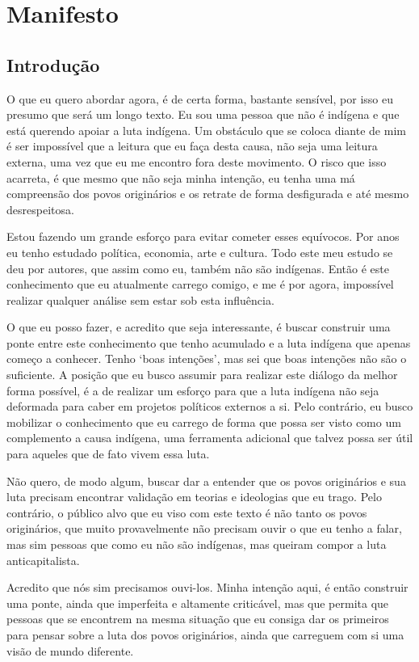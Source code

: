 \section{Manifesto}
\subsection{Introdução}

O que eu quero abordar agora, é de certa forma, bastante sensível, por isso eu presumo que será um longo texto. Eu sou uma pessoa que não é indígena e que está querendo apoiar a luta indígena. Um obstáculo que se coloca diante de mim é ser impossível que a leitura que eu faça desta causa, não seja uma leitura externa, uma vez que eu me encontro fora deste movimento. O risco que isso acarreta, é que mesmo que não seja minha intenção, eu tenha uma má compreensão dos povos originários e os retrate de forma desfigurada e até mesmo desrespeitosa.

Estou fazendo um grande esforço para evitar cometer esses equívocos. Por anos eu tenho estudado política, economia, arte e cultura. Todo este meu estudo se deu por autores, que assim como eu, também não são indígenas. Então é este conhecimento que eu atualmente carrego comigo, e me é por agora, impossível realizar qualquer análise sem estar sob esta influência.

O que eu posso fazer, e acredito que seja interessante, é buscar construir uma ponte entre este conhecimento que tenho acumulado e a luta indígena que apenas começo a conhecer. Tenho ‘boas intenções’, mas sei que boas intenções não são o suficiente. A posição que eu busco assumir para realizar este diálogo da melhor forma possível, é a de realizar um esforço para que a luta indígena não seja deformada para caber em projetos políticos externos a si. Pelo contrário, eu busco mobilizar o conhecimento que eu carrego de forma que possa ser visto como um complemento a causa indígena, uma ferramenta adicional que talvez possa ser útil para aqueles que de fato vivem essa luta.

Não quero, de modo algum, buscar dar a entender que os povos originários e sua luta precisam encontrar validação em teorias e ideologias que eu trago. Pelo contrário, o público alvo que eu viso com este texto é não tanto os povos originários, que muito provavelmente não precisam ouvir o que eu tenho a falar, mas sim pessoas que como eu não são indígenas, mas queiram compor a luta anticapitalista.

Acredito que nós sim precisamos ouvi-los. Minha intenção aqui, é então construir uma ponte, ainda que imperfeita e altamente criticável, mas que permita que pessoas que se encontrem na mesma situação que eu consiga dar os primeiros para pensar sobre a luta dos povos originários, ainda que carreguem com si uma visão de mundo diferente.

